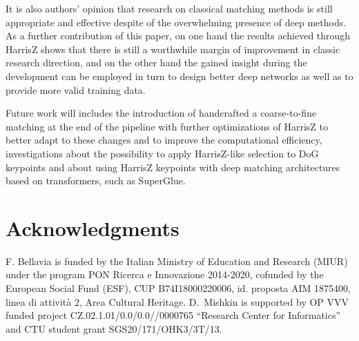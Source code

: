 \documentclass[times,twocolumn,final,authoryear]{elsarticle}
\begin{document}
It is also authors' opinion that research on classical matching methods is still appropriate and effective despite of the overwhelming presence of deep methods. As a further  contribution of this paper, on one hand the results achieved through HarrisZ shows that there is still a worthwhile margin of improvement in classic research direction, and on the other hand the gained insight during the development can be employed in turn to design better deep networks as well as to provide more valid training data.

Future work will includes the introduction of handcrafted a coarse-to-fine matching at the end of the pipeline with further optimizations of HarrisZ to better adapt to these changes and to improve the computational efficiency, investigations about the possibility to apply HarrisZ-like selection to DoG keypoints and about using HarrisZ keypoints with deep matching architectures based on transformers, such as SuperGlue.

\vspace{-1em}  
\section*{Acknowledgments}
\vspace{-0.5em}  
F. Bellavia is funded by the Italian Ministry of Education and Research (MIUR) under the program PON Ricerca e Innovazione 2014-2020, cofunded by the European Social Fund (ESF), CUP B74I18000220006, id. proposta AIM 1875400, linea di attivit\`{a} 2, Area Cultural Heritage.
D.\ Mishkin is supported by OP VVV funded project CZ.02.1.01/0.0/0.0//0000765 ``Research Center for Informatics'' and CTU student grant SGS20/171/OHK3/3T/13.
\vspace{-1em}



\end{document}
